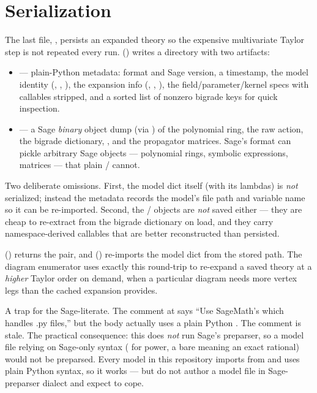 \section{Serialization}

The last file, , persists an expanded theory so the expensive
multivariate Taylor step is not repeated every run. 
() writes a directory with two artifacts:

\begin{itemize}
  \item {} --- plain-Python metadata: format and Sage version, a
        timestamp, the model identity (, ,
        ), the expansion info (,
        , ), the field/parameter/kernel specs
        with callables stripped, and a sorted list of nonzero bigrade keys for quick
        inspection.
  \item {} --- a Sage \emph{binary} object dump (via
        ) of the polynomial ring, the raw action, the bigrade
        dictionary, , and the propagator matrices. Sage's 
        format can pickle arbitrary Sage objects --- polynomial rings, symbolic
        expressions, matrices --- that plain / cannot.
\end{itemize}

\begin{gotcha}
Two deliberate omissions. First, the model dict itself (with its lambdas) is
\emph{not} serialized; instead the metadata records the model's file path and
variable name so it can be re-imported. Second, the /
objects are \emph{not} saved either --- they are cheap to re-extract from the bigrade
dictionary on load, and they carry namespace-derived callables that are better
reconstructed than persisted.
\end{gotcha}

 () returns the  pair,
and  () re-imports the model dict from the
stored path. The diagram enumerator uses exactly this round-trip to re-expand a saved
theory at a \emph{higher} Taylor order on demand, when a particular diagram needs more
vertex legs than the cached expansion provides.

\begin{gotcha}
A trap for the Sage-literate. The comment at  says ``Use
SageMath's  which handles .py files,'' but the body actually uses a plain
Python . The comment is stale. The
practical consequence: this  does \emph{not} run Sage's preparser, so a
model file relying on Sage-only syntax (\code{\^{}} for power, a bare  meaning
an exact rational) would not be preparsed. Every model in this repository imports from
 and uses plain Python syntax, so it works --- but do not author a model
file in Sage-preparser dialect and expect  to cope.
\end{gotcha}

